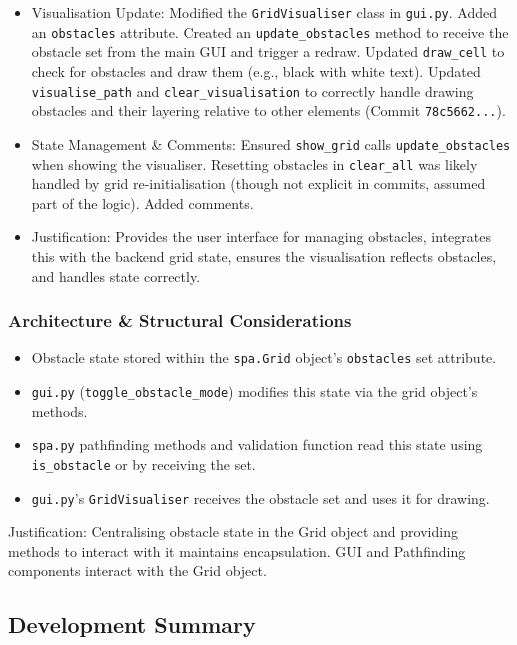 \begin{enumerate}
\begin{itemize}
        \item Visualisation Update: Modified the \verb|GridVisualiser| class in \verb|gui.py|. Added an \verb|obstacles| attribute. Created an \verb|update_obstacles| method to receive the obstacle set from the main GUI and trigger a redraw. Updated \verb|draw_cell| to check for obstacles and draw them (e.g., black with white text). Updated \verb|visualise_path| and \verb|clear_visualisation| to correctly handle drawing obstacles and their layering relative to other elements (Commit \verb|78c5662...|). 

        \item State Management \& Comments: Ensured \verb|show_grid| calls \verb|update_obstacles| when showing the visualiser. Resetting obstacles in \verb|clear_all| was likely handled by grid re-initialisation (though not explicit in commits, assumed part of the logic). Added comments.
        \item Justification: Provides the user interface for managing obstacles, integrates this with the backend grid state, ensures the visualisation reflects obstacles, and handles state correctly.
    \end{itemize}
\end{enumerate}

\subsubsection{Architecture \& Structural Considerations}
\begin{itemize}
	\item Obstacle state stored within the \verb|spa.Grid| object's \verb|obstacles| set attribute.
	\item \verb|gui.py| (\verb|toggle_obstacle_mode|) modifies this state via the grid object's methods.
	\item \verb|spa.py| pathfinding methods and validation function read this state using \verb|is_obstacle| or by receiving the set.
	\item \verb|gui.py|'s \verb|GridVisualiser| receives the obstacle set and uses it for drawing.
\end{itemize}
Justification: Centralising obstacle state in the Grid object and providing methods to interact with it maintains encapsulation. GUI and Pathfinding components interact with the Grid object.

\newpage
\subsection{Development Summary}

